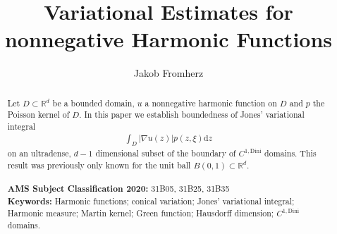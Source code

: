 \documentclass[a4paper,12pt]{article}
\date{}
\theoremstyle{definition}
\theoremstyle{definition}
\begin{document}
	\title{Variational Estimates for nonnegative Harmonic Functions}
	\author{Jakob Fromherz}
	\maketitle
	\begin{abstract}
		Let $D\subset\mathbb R^d$ be a bounded domain, $u$ a nonnegative harmonic function on $D$ and $p$ the Poisson kernel of $D$. In this paper we establish boundedness of Jones' variational integral
		\begin{align*}
			\int_D|\nabla u(z)|p(z,\xi)\mathrm dz
		\end{align*}
		on an ultradense, $d-1$ dimensional subset of the boundary of $C^{1,\mathrm{Dini}}$ domains. This result was previously only known for the unit ball $B(0,1)\subset\mathbb R^d$.\\\\
		
		\noindent\textbf{AMS Subject Classification 2020:} 31B05, 31B25, 31B35\\
		
		\noindent\textbf{Keywords:} Harmonic functions; conical variation; Jones' variational integral; Harmonic measure; Martin kernel; Green function; Hausdorff dimension; $C^{1,\mathrm{Dini}}$ domains.
	\end{abstract}
	
\end{document}
